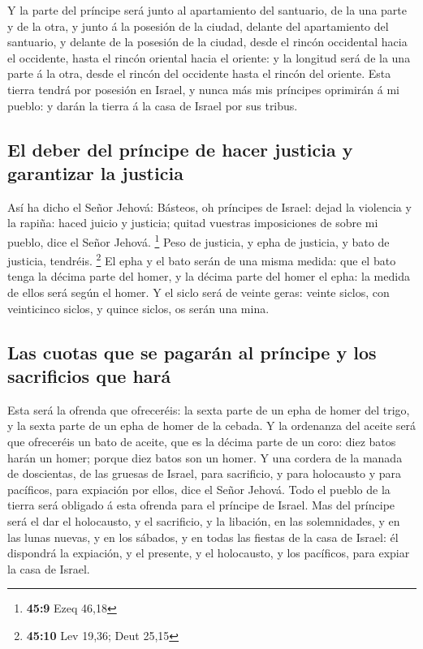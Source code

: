  Y la parte del príncipe será junto al apartamiento del
santuario, de la una parte y de la otra, y junto á la posesión de la
ciudad, delante del apartamiento del santuario, y delante de la posesión
de la ciudad, desde el rincón occidental hacia el occidente, hasta el
rincón oriental hacia el oriente: y la longitud será de la una parte á
la otra, desde el rincón del occidente hasta el rincón del oriente.
 Esta tierra tendrá por posesión en Israel, y nunca más
mis príncipes oprimirán á mi pueblo: y darán la tierra á la casa de
Israel por sus tribus.

\hypertarget{el-deber-del-pruxedncipe-de-hacer-justicia-y-garantizar-la-justicia}{%
\subsection{El deber del príncipe de hacer justicia y garantizar la
justicia}\label{el-deber-del-pruxedncipe-de-hacer-justicia-y-garantizar-la-justicia}}

 Así ha dicho el Señor Jehová: Básteos, oh príncipes de
Israel: dejad la violencia y la rapiña: haced juicio y justicia; quitad
vuestras imposiciones de sobre mi pueblo, dice el Señor Jehová.
\footnote{\textbf{45:9} Ezeq 46,18}  Peso de justicia, y
epha de justicia, y bato de justicia, tendréis. \footnote{\textbf{45:10}
  Lev 19,36; Deut 25,15}  El epha y el bato serán de una
misma medida: que el bato tenga la décima parte del homer, y la décima
parte del homer el epha: la medida de ellos será según el homer.
 Y el siclo será de veinte geras: veinte siclos, con
veinticinco siclos, y quince siclos, os serán una mina.

\hypertarget{las-cuotas-que-se-pagaruxe1n-al-pruxedncipe-y-los-sacrificios-que-haruxe1}{%
\subsection{Las cuotas que se pagarán al príncipe y los sacrificios que
hará}\label{las-cuotas-que-se-pagaruxe1n-al-pruxedncipe-y-los-sacrificios-que-haruxe1}}

 Esta será la ofrenda que ofreceréis: la sexta parte de
un epha de homer del trigo, y la sexta parte de un epha de homer de la
cebada.  Y la ordenanza del aceite será que ofreceréis un
bato de aceite, que es la décima parte de un coro: diez batos harán un
homer; porque diez batos son un homer.  Y una cordera de
la manada de doscientas, de las gruesas de Israel, para sacrificio, y
para holocausto y para pacíficos, para expiación por ellos, dice el
Señor Jehová.  Todo el pueblo de la tierra será obligado
á esta ofrenda para el príncipe de Israel.  Mas del
príncipe será el dar el holocausto, y el sacrificio, y la libación, en
las solemnidades, y en las lunas nuevas, y en los sábados, y en todas
las fiestas de la casa de Israel: él dispondrá la expiación, y el
presente, y el holocausto, y los pacíficos, para expiar la casa de
Israel.

